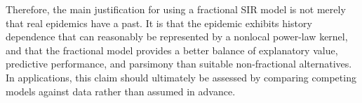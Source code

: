 \documentclass[00-main.tex]{subfiles}
\begin{document}
Therefore, the main justification for using a fractional SIR model is not merely that real epidemics have a past.
It is that the epidemic exhibits history dependence that can reasonably be represented by a nonlocal power-law kernel, and that the fractional model provides a better balance of explanatory value, predictive performance, and parsimony than suitable non-fractional alternatives.
In applications, this claim should ultimately be assessed by comparing competing models against data rather than assumed in advance.

\ifSubfilesClassLoaded{\printbibliography}{}
\end{document}
